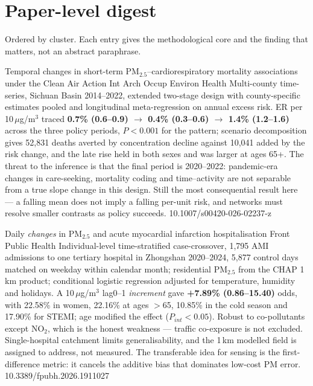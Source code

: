 \documentclass[10pt]{article}
\begin{document}
\section*{\sffamily\bfseries\color{Deep}Paper-level digest}
\vspace{-1.5mm}{\color{Amber}\rule{\linewidth}{1.1pt}}\vspace{1mm}

{\fontsize{7.4}{9}\selectfont\color{Slate}Ordered by cluster. Each entry gives the
methodological core and the finding that matters, not an abstract paraphrase.\par}


{Temporal changes in short-term PM$_{2.5}$--cardiorespiratory mortality associations under
the Clean Air Action}
{Int Arch Occup Environ Health}
{Multi-county time-series, Sichuan Basin 2014--2022, extended two-stage design with
county-specific estimates pooled and longitudinal meta-regression on annual excess risk.
ER per 10\,$\mu$g/m$^3$ traced \textbf{0.7\% (0.6--0.9) $\to$ 0.4\% (0.3--0.6) $\to$
1.4\% (1.2--1.6)} across the three policy periods, $P<0.001$ for the pattern; scenario
decomposition gives 52{,}831 deaths averted by concentration decline against 10{,}041 added
by the risk change, and the late rise held in both sexes and was larger at ages 65+.
The threat to the inference is that the final period is 2020--2022: pandemic-era changes in
care-seeking, mortality coding and time--activity are not separable from a true slope change
in this design. Still the most consequential result here --- a falling mean does not imply a
falling per-unit risk, and networks must resolve smaller contrasts as policy succeeds.}
{10.1007/s00420-026-02237-z}

{Daily \emph{changes} in PM$_{2.5}$ and acute myocardial infarction hospitalisation}
{Front Public Health}
{Individual-level time-stratified case-crossover, 1{,}795 AMI admissions to one tertiary
hospital in Zhongshan 2020--2024, 5{,}877 control days matched on weekday within calendar
month; residential PM$_{2.5}$ from the CHAP 1\,km product; conditional logistic regression
adjusted for temperature, humidity and holidays. A 10\,$\mu$g/m$^3$ lag0--1 \emph{increment}
gave \textbf{+7.89\% (0.86--15.40)} odds, with 22.58\% in women, 22.16\% at ages $>$65,
10.85\% in the cold season and 17.90\% for STEMI; age modified the effect ($P_{int}<0.05$).
Robust to co-pollutants except NO$_2$, which is the honest weakness --- traffic co-exposure
is not excluded. Single-hospital catchment limits generalisability, and the 1\,km modelled
field is assigned to address, not measured. The transferable idea for sensing is the
first-difference metric: it cancels the additive bias that dominates low-cost PM error.}
{10.3389/fpubh.2026.1911027}
\end{document}
